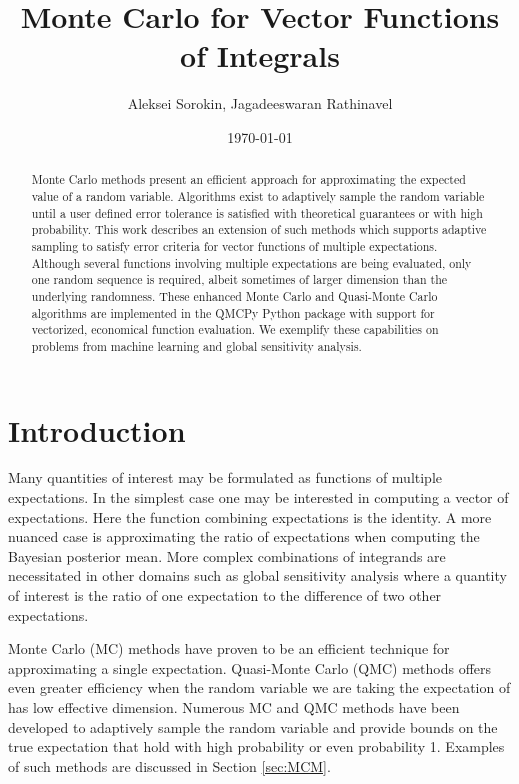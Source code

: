 \documentclass{article}[12pt]
\title{Monte Carlo for Vector Functions of Integrals}
\author{Aleksei Sorokin, Jagadeeswaran Rathinavel}
\date{\today}
\begin{document}
\maketitle

\begin{abstract}
Monte Carlo methods present an efficient approach for approximating the expected value of a random variable. Algorithms exist to adaptively sample the random variable until a user defined error tolerance is satisfied with theoretical guarantees or with high probability. This work describes an extension of such methods which supports adaptive sampling to satisfy error criteria for vector functions of multiple expectations. Although several functions involving multiple expectations are being evaluated, only one random sequence is required, albeit sometimes of larger dimension than the underlying randomness. These enhanced Monte Carlo and Quasi-Monte Carlo algorithms are implemented in the QMCPy Python package with support for vectorized, economical function evaluation. We exemplify these capabilities on problems from machine learning and global sensitivity analysis.
\end{abstract}

\tableofcontents

\newpage

\section{Introduction}

Many quantities of interest may be formulated as functions of multiple expectations. In the simplest case one may be interested in computing a vector of expectations. Here the function combining expectations is the identity. A more nuanced case is approximating the ratio of expectations when computing the Bayesian posterior mean. More complex combinations of integrands are necessitated in other domains such as global sensitivity analysis where a quantity of interest is the ratio of one expectation to the difference of two other expectations.

Monte Carlo (MC) methods have proven to be an efficient technique for approximating a single expectation. Quasi-Monte Carlo (QMC) methods  offers even greater efficiency when the random variable we are taking the expectation of has low effective dimension. Numerous MC and QMC methods have been developed to adaptively sample the random variable and provide bounds on the true expectation that hold with high probability or even probability 1. Examples of such methods are discussed in Section \ref{sec:MCM}. 
\end{document}
